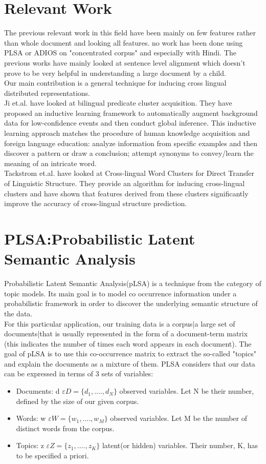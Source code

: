 \documentclass{article}
\begin{document}
\section{Relevant Work}
The previous relevant work in this field have been mainly on few features rather than whole document and looking all features. no work has been done using PLSA or ADIOS on "concentrated corpus" and especially with Hindi. The previous works have mainly looked at sentence level alignment which doesn't prove to be very helpful in understanding a large document by a child. \\
Our main contribution is a general technique for inducing cross lingual distributed representations.\\
Ji et.al. have looked at bilingual predicate cluster acquisition. They have proposed an inductive learning framework to automatically augment background data for low-confidence events and then conduct global inference. This inductive learning approach matches the procedure of human knowledge acquisition and foreign language education: analyze information from specific examples and then discover a pattern or draw a conclusion; attempt synonyms to convey/learn the meaning of an intricate word.\\
Tackstrom et.al. have looked at Cross-lingual Word Clusters for Direct Transfer of Linguistic Structure. They provide an algorithm for inducing cross-lingual clusters and have shown that features derived from these clusters significantly improve the accuracy of cross-lingual structure prediction.\\

\section{PLSA:Probabilistic Latent Semantic Analysis}
\normalsize Probabilistic Latent Semantic Analysis(pLSA) is a technique from the category of topic models. Its main goal is to model co occurrence information under a probabilistic framework in order to discover the underlying semantic structure of the data.\\
For this particular application, our training data is a corpus|a large set of documents|that is usually represented in the
form of a document-term matrix (this indicates the number of times each word appears in each document). The goal of pLSA is to use this
co-occurrence matrix to extract the so-called "topics" and explain the documents as a mixture of them.
PLSA considers that our data can be expressed in terms of 3 sets of variables:\\
\begin{itemize}
\item Document{s}: d \ensuremath{{\varepsilon} D = \{d_{1},. . . .,d_{N}\}} observed variables. Let N be their number, defined by the size of our given corpus.
\item Words: w \ensuremath{{\varepsilon} W = \{w_{1},. . . .,w_{M}\}} observed variables. Let M be the number of distinct words from the corpus.
\item Topics: z \ensuremath{{\varepsilon} Z = \{z_{1},. . . .,z_{K}\}} latent(or hidden) variables. Their number, K, has to be specified a priori.
\end{itemize}
\end{document}
